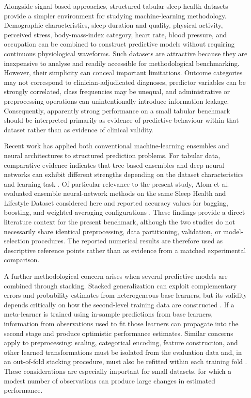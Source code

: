 \documentclass[a4paper,fleqn]{cas-dc}
\begin{document}
Alongside signal-based approaches, structured tabular sleep-health datasets provide a simpler environment for studying machine-learning methodology. Demographic characteristics, sleep duration and quality, physical activity, perceived stress, body-mass-index category, heart rate, blood pressure, and occupation can be combined to construct predictive models without requiring continuous physiological waveforms. Such datasets are attractive because they are inexpensive to analyse and readily accessible for methodological benchmarking. However, their simplicity can conceal important limitations. Outcome categories may not correspond to clinician-adjudicated diagnoses, predictor variables can be strongly correlated, class frequencies may be unequal, and administrative or preprocessing operations can unintentionally introduce information leakage. Consequently, apparently strong performance on a small tabular benchmark should be interpreted primarily as evidence of predictive behaviour within that dataset rather than as evidence of clinical validity.

Recent work has applied both conventional machine-learning ensembles and neural architectures to structured prediction problems. For tabular data, comparative evidence indicates that tree-based ensembles and deep neural networks can exhibit different strengths depending on the dataset characteristics and learning task \cite{borisov2024}. Of particular relevance to the present study, Alom et al. evaluated ensemble neural-network methods on the same Sleep Health and Lifestyle Dataset considered here and reported accuracy values for bagging, boosting, and weighted-averaging configurations \cite{alom2024}. These findings provide a direct literature context for the present benchmark, although the two studies do not necessarily share identical preprocessing, data partitioning, validation, or model-selection procedures. The reported numerical results are therefore used as descriptive reference points rather than as evidence from a matched experimental comparison.


A further methodological concern arises when several predictive models are combined through stacking. Stacked generalization can exploit complementary errors and probability estimates from heterogeneous base learners, but its validity depends critically on how the second-level training data are constructed \cite{wolpert1992}. If a meta-learner is trained using in-sample predictions from base learners, information from observations used to fit those learners can propagate into the second stage and produce optimistic performance estimates. Similar concerns apply to preprocessing: scaling, categorical encoding, feature construction, and other learned transformations must be isolated from the evaluation data and, in an out-of-fold stacking procedure, must also be refitted within each training fold \cite{kapoor2023,efthimiou2024,collins2024}. These considerations are especially important for small datasets, for which a modest number of observations can produce large changes in estimated performance.
\end{document}
